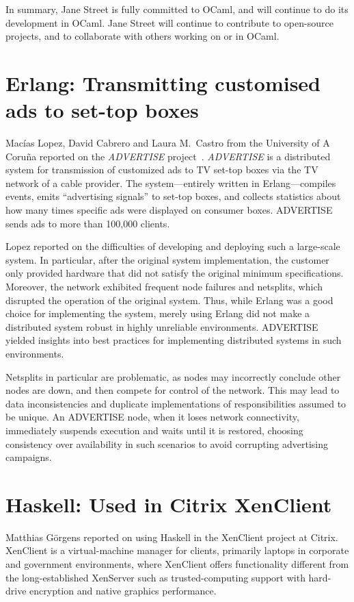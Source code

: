 \documentclass{jfp1}
\begin{document}
In summary, Jane Street is fully committed to OCaml, and will continue
to do its development in OCaml.  Jane Street will continue to
contribute to open-source projects, and to collaborate with others
working on or in OCaml.

\section{Erlang: Transmitting customised ads to set-top boxes}

Macías Lopez, David Cabrero and Laura M.\ Castro from the University
of A Coruña reported on the \textit{ADVERTISE}
project~\cite{Lopez:2012:DDA:2370776.2370800,
  Lopez:2012:FTC:2364489.2364498}.  \textit{ADVERTISE} is a
distributed system for transmission of customized ads to TV set-top
boxes via the TV network of a cable provider.  The system---entirely
written in Erlang---compiles events, emits ``advertising signals'' to
set-top boxes, and collects statistics about how many times specific
ads were displayed on consumer boxes.  ADVERTISE sends ads to more
than 100,000 clients.

Lopez reported on the difficulties of developing and deploying such a
large-scale system.  In particular, after the original system
implementation, the customer only provided hardware that did not
satisfy the original minimum specifications.  Moreover, the network
exhibited frequent node failures and netsplits, which disrupted the
operation of the original system.  Thus, while Erlang was a good
choice for implementing the system, merely using Erlang did not make
a distributed system robust in highly unreliable environments.
ADVERTISE yielded insights into best practices for implementing
distributed systems in such environments.

Netsplits in particular are problematic, as nodes may incorrectly
conclude other nodes are down, and then compete for control of the
network.  This may lead to data inconsistencies and duplicate
implementations of responsibilities assumed to be unique. An ADVERTISE
node, when it loses network connectivity, immediately suspends
execution and waits until it is restored, choosing consistency over
availability in such scenarios to avoid corrupting advertising
campaigns.

\section{Haskell: Used in Citrix XenClient}

Matthias Görgens reported on using Haskell in the XenClient project at
Citrix. XenClient is a virtual-machine manager for clients, primarily
laptops in corporate and government environments, where XenClient
offers functionality different from the long-established XenServer
such as trusted-computing support with hard-drive encryption and
native graphics performance.
\end{document}
